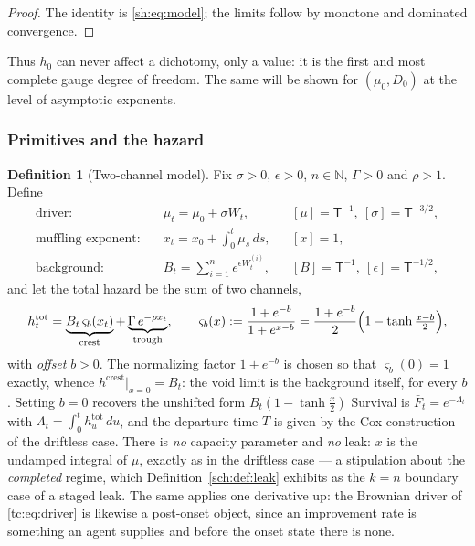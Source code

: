 \documentclass[11pt]{article}
\numberwithin{equation}{section}
\theoremstyle{plain}
\theoremstyle{definition}
\newtheorem{definition}[theorem]{Definition}
\theoremstyle{remark}
\begin{document}
\begin{proof}
The identity is \eqref{sh:eq:model}; the limits follow by monotone and
dominated convergence.
\end{proof}

Thus $h_0$ can never affect a dichotomy, only a value: it is the first and
most complete gauge degree of freedom. The same will be shown for
$(\mu_0,D_0)$ at the level of asymptotic exponents.

\subsubsection{Primitives and the hazard}\label{tc:subsub:primitives}

\begin{definition}[Two-channel model]\label{tc:def:model}
Fix $\sigma>0$, $\epsilon>0$, $n\in\mathbb N$, $\Gamma>0$ and
$\rho>1$. Define
\begin{align}
\text{driver:}&\quad \mu_t=\mu_0+\sigma W_t,
&&[\mu]=\mathsf T^{-1},\ [\sigma]=\mathsf T^{-3/2},
\label{tc:eq:driver}\\
\text{muffling exponent:}&\quad x_t=x_0+\int_0^t\mu_s\,ds,
&&[x]=1,
\label{tc:eq:x}\\
\text{background:}&\quad B_t=\sum_{i=1}^{n}e^{\epsilon W^{(i)}_t},
&&[B]=\mathsf T^{-1},\ [\epsilon]=\mathsf T^{-1/2},
\label{tc:eq:B}
\end{align}
and let the total hazard be the sum of two channels,
\begin{equation}\label{tc:eq:hazard}
h^{\mathrm{tot}}_t
=\underbrace{B_t\,\varsigma_b(x_t)}_{\text{crest}}
+\underbrace{\Gamma\,e^{-\rho x_t}}_{\text{trough}},
\qquad
\varsigma_b(x):=\frac{1+e^{-b}}{1+e^{x-b}}
=\frac{1+e^{-b}}{2}\Bigl(1-\tanh\tfrac{x-b}{2}\Bigr),
\end{equation}
with \emph{offset} $b>0$. The normalizing factor $1+e^{-b}$ is chosen so
that $\varsigma_b(0)=1$ exactly, whence $h^{\mathrm{crest}}|_{x=0}=B_t$:
the void limit is the background itself, for every $b$. Setting $b=0$
recovers the unshifted form $B_t(1-\tanh\frac{x}{2})$
Survival is $\bar F_t=e^{-\Lambda_t}$ with
$\Lambda_t=\int_0^t h^{\mathrm{tot}}_u\,du$, and the departure time $T$
is given by the Cox construction of the driftless case. There is \emph{no}
capacity parameter and \emph{no} leak: $x$ is the undamped integral of
$\mu$, exactly as in the driftless case --- a stipulation about the
\emph{completed} regime, which Definition~\ref{sch:def:leak} exhibits as
the $k=n$ boundary case of a staged leak. The same applies one derivative
up: the Brownian driver of \eqref{tc:eq:driver} is likewise a post-onset
object, since an improvement rate is something an agent supplies and
before the onset state there is none.
\end{definition}
\end{document}
